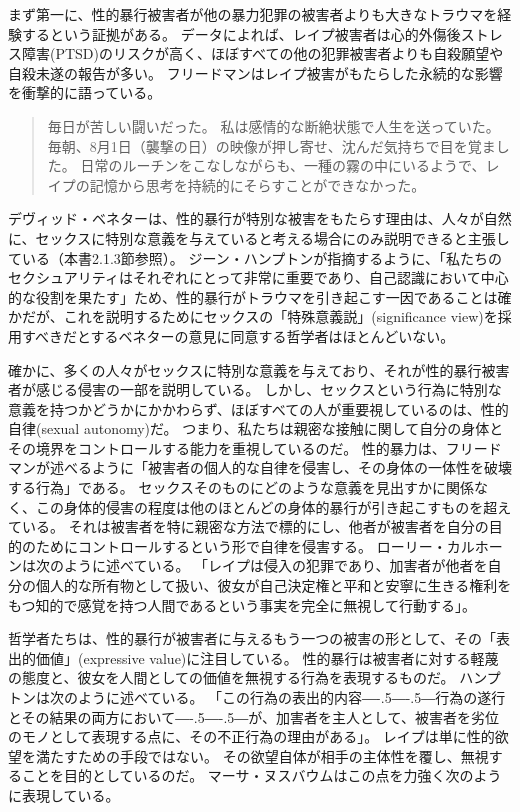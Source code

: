 \documentclass[paper=a4,book,openany]{jlreq}
\newcommand{\ig}[1]{}           %
\def\DDASH{―\kern-.5\zw―\kern-.5\zw―}
\begin{document}
まず第一に、性的暴行被害者が他の暴力犯罪の被害者よりも大きなトラウマを経験するという証拠がある。
データによれば、レイプ被害者は心的外傷後ストレス障害(PTSD)のリスクが高く、ほぼすべての他の犯罪被害者よりも自殺願望や自殺未遂の報告が多い\citep[p.104]{wertheimer03:_consen_sexual_relat}。
フリードマン\ig{Karyn L. Freedman}はレイプ被害がもたらした永続的な影響を衝撃的に語っている。

\begin{quote}
毎日が苦しい闘いだった。
私は感情的な断絶状態で人生を送っていた。
毎朝、8月1日（襲撃の日）の映像が押し寄せ、沈んだ気持ちで目を覚ました。
日常のルーチンをこなしながらも、一種の霧の中にいるようで、レイプの記憶から思考を持続的にそらすことができなかった。
\citep{freedman14:_one_hour_paris}
\end{quote}

デヴィッド・ベネターは、性的暴行が特別な被害をもたらす理由は、人々が自然に、セックスに特別な意義を与えていると考える場合にのみ説明できると主張している（本書2.1.3節参照）。
ジーン・ハンプトン\ig{Jean Hampton}が指摘するように、「私たちのセクシュアリティはそれぞれにとって非常に重要であり、自己認識において中心的な役割を果たす」ため、性的暴行がトラウマを引き起こす一因であることは確かだが、これを説明するためにセックスの「特殊意義説」(significance view)を採用すべきだとするベネター\ig{Benatar}の意見に同意する哲学者はほとんどいない\citep[p.151]{hampton99:_defin_wrong_and_defin_rape}。

確かに、多くの人々がセックスに特別な意義を与えており、それが性的暴行被害者が感じる侵害の一部を説明している。
しかし、セックスという行為に特別な意義を持つかどうかにかかわらず、ほぼすべての人が重要視しているのは、性的自律(sexual autonomy)だ。
つまり、私たちは親密な接触に関して自分の身体とその境界をコントロールする能力を重視しているのだ。
性的暴力は、フリードマン\ig{Karyn L. Freedman}が述べるように「被害者の個人的な自律を侵害し、その身体の一体性を破壊する行為」である。
セックスそのものにどのような意義を見出すかに関係なく、この身体的侵害の程度は他のほとんどの身体的暴行が引き起こすものを超えている。
それは被害者を特に親密な方法で標的にし、他者が被害者を自分の目的のためにコントロールするという形で自律を侵害する。
ローリー・カルホーンは次のように述べている。
「レイプは侵入の犯罪であり、加害者が他者を自分の個人的な所有物として扱い、彼女が自己決定権と平和と安寧に生きる権利をもつ知的で感覚を持つ人間であるという事実を完全に無視して行動する」\citep[p.109]{calhoun97:_rape}。

哲学者たちは、性的暴行が被害者に与えるもう一つの被害の形として、その「表出的価値」(expressive value)に注目している。
性的暴行は被害者に対する軽蔑の態度と、彼女を人間としての価値を無視する行為を表現するものだ。
ハンプトンは次のように述べている。
「この行為の表出的内容{\DDASH}行為の遂行とその結果の両方において{\DDASH}が、加害者を主人として、被害者を劣位のモノとして表現する点に、その不正行為の理由がある」\citep[p.135]{hampton99:_defin_wrong_and_defin_rape}。
レイプは単に性的欲望を満たすための手段ではない。
その欲望自体が相手の主体性を覆し、無視することを目的としているのだ。
マーサ・ヌスバウムはこの点を力強く次のように表現している。
\end{document}
